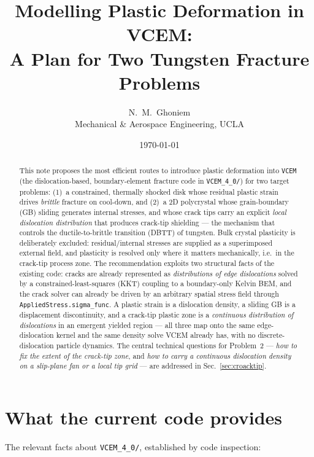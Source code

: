 \documentclass[11pt]{article}
\title{\textbf{Modelling Plastic Deformation in VCEM:\\
A Plan for Two Tungsten Fracture Problems}}
\author{N.\ M.\ Ghoniem \\ \small Mechanical \& Aerospace Engineering, UCLA}
\date{\today}
\begin{document}
\maketitle

\begin{abstract}
This note proposes the most efficient routes to introduce plastic deformation
into \texttt{VCEM} (the dislocation-based, boundary-element fracture code in
\texttt{VCEM\_4\_0/}) for two target problems:
(1)~a constrained, thermally shocked disk whose residual plastic strain drives
\emph{brittle} fracture on cool-down, and
(2)~a 2D polycrystal whose grain-boundary (GB) sliding generates internal
stresses, and whose crack tips carry an explicit \emph{local dislocation
distribution} that produces crack-tip shielding --- the mechanism that controls
the ductile-to-brittle transition (DBTT) of tungsten. Bulk crystal plasticity
is deliberately excluded: residual/internal stresses are supplied as a
superimposed external field, and plasticity is resolved only where it matters
mechanically, i.e.\ in the crack-tip process zone. The recommendation exploits
two structural facts of the existing code: cracks are already represented as
\emph{distributions of edge dislocations} solved by a constrained-least-squares
(KKT) coupling to a boundary-only Kelvin BEM, and the crack solver can already
be driven by an arbitrary spatial stress field through
\texttt{AppliedStress.sigma\_func}. A plastic strain is a dislocation density, a
sliding GB is a displacement discontinuity, and a crack-tip plastic zone is a
\emph{continuous distribution of dislocations} in an emergent yielded region ---
all three map onto the same edge-dislocation kernel and the same density solve
VCEM already has, with no discrete-dislocation particle dynamics. The central
technical questions for Problem~2 --- \emph{how to fix the extent of the
crack-tip zone}, and \emph{how to carry a continuous dislocation density on a
slip-plane fan or a local tip grid} --- are addressed in
Sec.~\ref{sec:croacktip}.
\end{abstract}

\tableofcontents

\section{What the current code provides}
\label{sec:current}

The relevant facts about \texttt{VCEM\_4\_0/}, established by code inspection:
\end{document}
